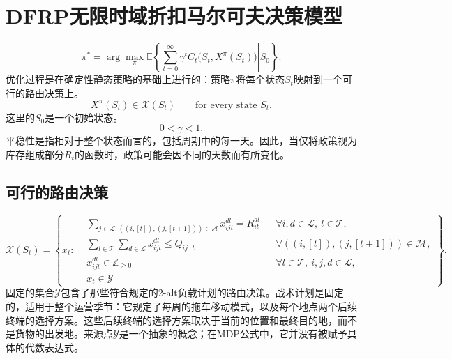 \documentclass{article}
\begin{document}
\section*{DFRP无限时域折扣马尔可夫决策模型}

\[
\pi^*=\arg\max_{\pi}\mathbb{E}\left\{\left.
\sum_{t=0}^{\infty}\gamma^t C_t\bigl(S_t,X^\pi(S_t)\bigr)
\right|S_0\right\}.
\]
优化过程是在确定性静态策略的基础上进行的：策略$\pi$将每个状态$S_t$映射到一个可行的路由决策上。
\[
X^\pi(S_t)\in\mathcal{X}(S_t)\qquad\text{for every state }S_t.
\]
这里的$S_0$是一个初始状态。
\[
0<\gamma<1.
\]
平稳性是指相对于整个状态而言的，包括周期中的每一天。因此，当仅将政策视为库存组成部分$R_t$的函数时，政策可能会因不同的天数而有所变化。

\subsection*{可行的路由决策}
\begin{equation}
\mathcal{X}(S_t)=\left\{x_t:\begin{aligned}
&\sum_{j\in\mathcal{L}:((i,[t]),(j,[t+1]))\in\mathcal{A}}x_{ijt}^{dl}=R_{it}^{dl}
&&\forall i,d\in\mathcal{L},\ l\in\mathcal{T},\\
&\sum_{l\in\mathcal{T}}\sum_{d\in\mathcal{L}}x_{ijt}^{dl}\leq Q_{ij[t]}
&&\forall ((i,[t]),(j,[t+1]))\in\mathcal{M},\\
&x_{ijt}^{dl}\in\mathbb{Z}_{\geq0}
&&\forall l\in\mathcal{T},\ i,j,d\in\mathcal{L},\\
&x_t\in\mathcal{Y}
\end{aligned}\right\}.
\tag{1}
\end{equation}
固定的集合$\mathcal{Y}$包含了那些符合规定的2-alt负载计划的路由决策。战术计划是固定的，适用于整个运营季节：它规定了每周的拖车移动模式，以及每个地点两个后续终端的选择方案。这些后续终端的选择方案取决于当前的位置和最终目的地，而不是货物的出发地。来源点$\mathcal{Y}$是一个抽象的概念；在MDP公式中，它并没有被赋予具体的代数表达式。
\end{document}
